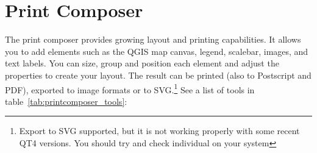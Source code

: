 
\section{Print Composer}\label{label_printcomposer}


The print composer provides growing layout and printing
capabilities. It allows you to add elements such as the QGIS map canvas, 
legend, scalebar, images, and text labels. You can size, group 
and position each element and adjust the properties to create your layout. 
The result can be printed (also to Postscript and PDF), exported to image 
formats or to SVG.\footnote{Export to SVG supported, but it is not working 
properly with some recent QT4 versions. You should try and check individual 
on your system} See a list of tools in table~\ref{tab:printcomposer_tools}:

